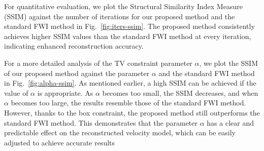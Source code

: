 For quantitative evaluation, we plot the Structural Similarity Index Measure (SSIM) against the number of iterations for our proposed method and the standard FWI method in Fig.~\ref{fig:iters-ssim}.
The proposed method consistently achieves higher SSIM values than the standard FWI method at every iteration, indicating enhanced reconstruction accuracy.

For a more detailed analysis of the TV constraint parameter $\alpha$, we plot the SSIM of our proposed method against the parameter $\alpha$ and the standard FWI method in Fig.~\ref{fig:alpha-ssim}.
As mentioned earlier, a high SSIM can be achieved if the value of $\alpha$ is appropriate.
As $\alpha$ becomes too small, the SSIM decreases, and when $\alpha$ becomes too large, the results resemble those of the standard FWI method.
However, thanks to the box constraint, the proposed method still outperforms the standard FWI method.
This demonstrates that the parameter $\alpha$ has a clear and predictable effect on the reconstructed velocity model, which can be easily adjusted to achieve accurate results
